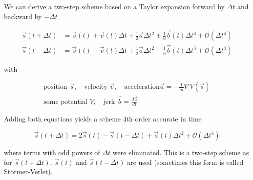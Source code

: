 
We can derive a two-step scheme based on a Taylor expansion forward by $\Delta t$ and backward by $-\Delta t$

\begin{equation}
  \label{eq:stormer}
  \begin{aligned}
    \vec{s}(t+\Delta t) &= \vec{s}(t) + \vec{v}(t)\Delta t + \frac{1}{2} \vec{a} \Delta t^2 + \frac{1}{6} \vec{b}(t) \Delta t^3 + \mathcal{O}(\Delta t^4) \\
    \vec{s}(t-\Delta t) &= \vec{s}(t) - \vec{v}(t)\Delta t + \frac{1}{2} \vec{a} \Delta t^2 - \frac{1}{6} \vec{b}(t) \Delta t^3 + \mathcal{O}(\Delta t^4)
  \end{aligned}
\end{equation}

with

\begin{equation}
  \begin{gathered}
    \text{position } \vec{s}, \quad \text{velocity } \vec{v}, \quad \text{acceleration} \vec{a} = - \frac{1}{m} \nabla V(\vec{s}) \\
    \text{some potential } V, \quad \text{jerk } \vec{b} = \frac{d\vec{a}}{dt}
  \end{gathered}
\end{equation}

Adding both equations yields a scheme 4th order accurate in time

\begin{equation}
  \vec{s}(t+\Delta t) = 2 \vec{s}(t) - \vec{s}(t-\Delta t) + \vec{a}(t) \Delta t^2 + \mathcal{O}(\Delta t^4)
\end{equation}

where terms with odd powers of $\Delta t$ were eliminated. This is a two-step scheme as for $\vec{s}(t+\Delta t)$, $\vec{s}(t)$ and $\vec{s}(t-\Delta t)$
are used (sometimes this form is called Störmer-Verlet).


